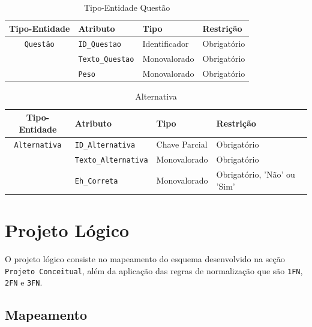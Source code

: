 \documentclass[12pt,a4paper]{article}
\begin{document}
\begin{table}[h]
  \centering
  \caption{Tipo-Entidade Questão}
    \begin{tabular}{|c|c|l|l|l|}
    \toprule\hline
    \multicolumn{2}{|c|}{\textbf{Tipo-Entidade}} & \textbf{Atributo} & \textbf{Tipo} & \textbf{Restrição} \\\hline
    \midrule
    \multicolumn{2}{|c|}{\texttt{Questão}} & \texttt{ID\_Questao} & Identificador & Obrigatório \\
    \midrule
    \multicolumn{2}{|c|}{} & \texttt{Texto\_Questao} & Monovalorado & Obrigatório \\
    \midrule
    \multicolumn{2}{|c|}{} & \texttt{Peso} & Monovalorado & Obrigatório \\
    \midrule
    \bottomrule\hline
    \end{tabular}%
  \label{tab:meta_questao}%
\end{table}%

\begin{table}[h]
  \centering
  \caption{Alternativa}
    \begin{tabular}{|c|c|l|l|l|}
    \toprule\hline
    \multicolumn{2}{|c|}{\textbf{Tipo-Entidade}} & \textbf{Atributo} & \textbf{Tipo} & \textbf{Restrição} \\\hline
    \midrule
    \multicolumn{2}{|c|}{\texttt{Alternativa}} & \texttt{ID\_Alternativa} & Chave Parcial & Obrigatório \\
    \midrule
    \multicolumn{2}{|c|}{} & \texttt{Texto\_Alternativa} & Monovalorado & Obrigatório \\
    \midrule
    \multicolumn{2}{|c|}{} & \texttt{Eh\_Correta} & Monovalorado & Obrigatório, 'Não' ou 'Sim' \\
    \midrule
    \bottomrule\hline
    \end{tabular}%
  \label{tab:meta_alternativa}%
\end{table}%
\pagebreak

\section{Projeto Lógico}

O projeto lógico consiste no mapeamento do esquema desenvolvido na seção \texttt{Projeto Conceitual}, além da aplicação das regras de normalização que são \texttt{1FN}, \texttt{2FN} e \texttt{3FN}.

\subsection{Mapeamento}
\end{document}

